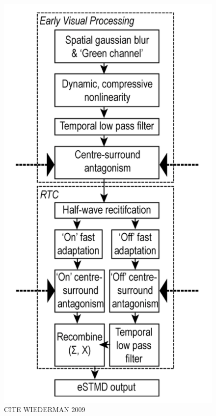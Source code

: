 \documentclass[a4paper,11pt]{article}
\begin{document}
\begin{figure}[hb]
\centering
\includegraphics[scale = 0.5]{wiederman09}
\caption{CITE WIEDERMAN 2009}
\end{figure}
\end{document}
